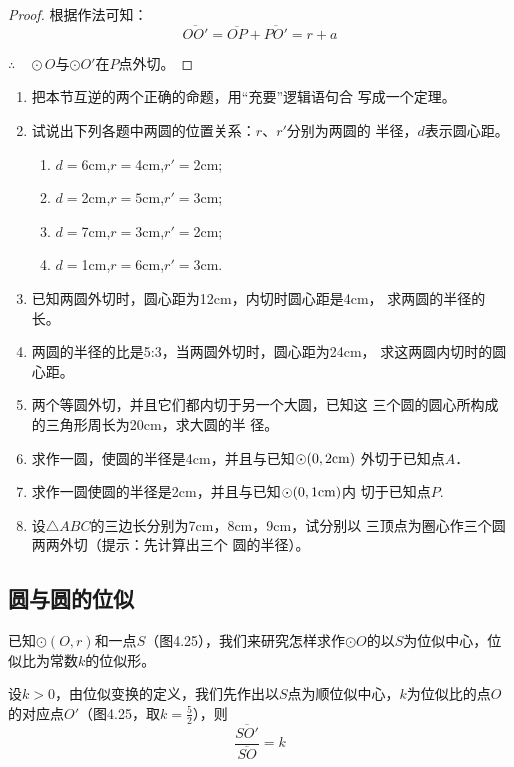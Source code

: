 \begin{proof}
  根据作法可知：
\[\overline{OO'}=\overline{OP}+\overline{PO'}=r+a\]

$\therefore\quad \odot O$与$\odot O'$在$P$点外切。
\end{proof}

\begin{ex}
\begin{enumerate}
\item 把本节互逆的两个正确的命题，用“充要”逻辑语句合
写成一个定理。
\item 试说出下列各题中两圆的位置关系：$r$、$r'$分别为两圆的
半径，$d$表示圆心距。
\begin{enumerate}
\item $d=$6cm,\quad $r=$4cm,\quad $r'=$2cm;
\item $d=$2cm,\quad $r=5$cm,\quad $r'=$3cm;
\item $d=$7cm,\quad $r=3$cm,\quad $r'=$2cm;
\item $d=$1cm,\quad $r=6$cm,\quad $ r'=$3cm.
\end{enumerate}

\item 已知两圆外切时，圆心距为12cm，内切时圆心距是4cm，
求两圆的半径的长。
\item 两圆的半径的比是5:3，当两圆外切时，圆心距为24cm，
求这两圆内切时的圆心距。
\item 两个等圆外切，并且它们都内切于另一个大圆，已知这
三个圆的圆心所构成的三角形周长为20cm，求大圆的半
径。
\item 求作一圆，使圆的半径是4cm，并且与已知$\odot (0,2{\rm cm})$
外切于已知点$A$．
\item 求作一圆使圆的半径是2cm，并且与已知$\odot (0,1{\rm cm})$内
切于已知点$P$.
\item 设$\triangle ABC$的三边长分别为7cm，8cm，9cm，试分别以
三顶点为圈心作三个圆两两外切（提示：先计算出三个
圆的半径）。
\end{enumerate}
\end{ex}

\subsection{圆与圆的位似}
已知$\odot (O,r)$和一点$S$（图4.25），我们来研究怎样求作$\odot O$的以$S$为位似中心，位似比为常数$k$的位似形。

设$k>0$，由位似变换的定义，我们先作出以$S$点为顺位似中心，$k$为位似比的点$O$的对应点$O'$（图4.25，取$k=\frac{5}{2}$），则
\[\frac{\overline{SO'}}{\overline{SO}}=k\]
\begin{figure}[htp]
  \centering
{}
  \caption{}
\end{figure}

